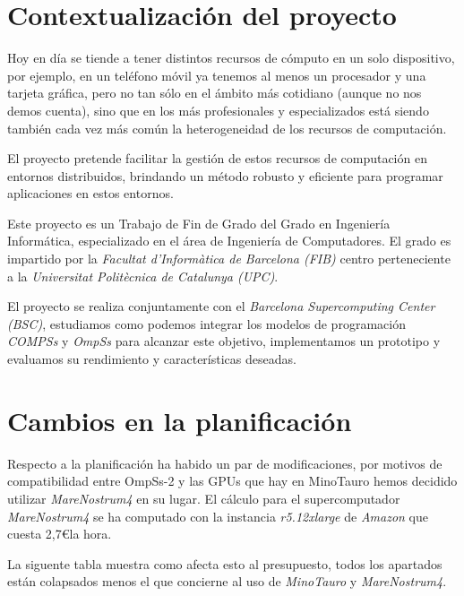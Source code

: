 \section{Contextualización del proyecto}

Hoy en día se tiende a tener distintos recursos de cómputo en un solo dispositivo, por ejemplo, en un teléfono móvil ya tenemos al menos un procesador y una tarjeta gráfica, pero no tan sólo en el ámbito más cotidiano (aunque no nos demos cuenta), sino que en los más profesionales y especializados está siendo también cada vez más común la heterogeneidad de los recursos de computación. 
\par\bigskip

El proyecto pretende facilitar la gestión de estos recursos de computación en entornos distribuidos, brindando un método robusto y eficiente para programar aplicaciones en estos entornos.
\par\bigskip

Este proyecto es un Trabajo de Fin de Grado del Grado en Ingeniería Informática, especializado en el área de Ingeniería de Computadores. El grado es impartido por la \textit{Facultat d'Informàtica de Barcelona (FIB)} centro perteneciente a la \textit{Universitat Politècnica de Catalunya (UPC)}. 
\par\bigskip

El proyecto se realiza conjuntamente con el \textit{Barcelona Supercomputing Center (BSC)}, estudiamos como podemos integrar los modelos de programación \textit{COMPSs} y \textit{OmpSs} para alcanzar este objetivo, implementamos un prototipo y evaluamos su rendimiento y características deseadas. 

\section{Cambios en la planificación}

Respecto a la planificación ha habido un par de modificaciones, por motivos de compatibilidad entre OmpSs-2 y las GPUs que hay en MinoTauro hemos decidido utilizar \textit{MareNostrum4} en su lugar. El cálculo para el supercomputador \textit{MareNostrum4} se ha computado con la instancia \textit{r5.12xlarge} de \textit{Amazon} que cuesta 2,7\euro la hora.
\bigskip


La siguente tabla muestra como afecta esto al presupuesto, todos los apartados están colapsados menos el que concierne al uso de \textit{MinoTauro} y \textit{MareNostrum4}.

